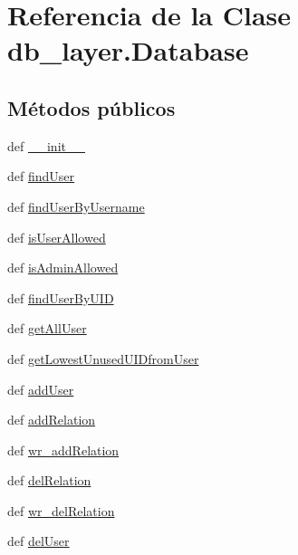 \hypertarget{classdb__layer_1_1_database}{\section{Referencia de la Clase db\-\_\-layer.\-Database}
\label{classdb__layer_1_1_database}
}
\subsection*{Métodos públicos}
\begin{DoxyCompactItemize}
\item 
def \hyperlink{classdb__layer_1_1_database_a2e4b8be9ebcb91f37e9377164e060c2a}{\-\_\-\-\_\-init\-\_\-\-\_\-}
\item 
def \hyperlink{classdb__layer_1_1_database_aaa54107650dc6511c7afdaf98112d4c1}{find\-User}
\item 
def \hyperlink{classdb__layer_1_1_database_a321ec63103a76c21fb556f82bc03e08f}{find\-User\-By\-Username}
\item 
def \hyperlink{classdb__layer_1_1_database_a738e07ff3b7292931bb057d174866249}{is\-User\-Allowed}
\item 
def \hyperlink{classdb__layer_1_1_database_a1f4a9b4e8dbd15d9f0ce74c1464ec3f9}{is\-Admin\-Allowed}
\item 
def \hyperlink{classdb__layer_1_1_database_aa97a7c93c41d97e60600dec9fb87270e}{find\-User\-By\-U\-I\-D}
\item 
def \hyperlink{classdb__layer_1_1_database_aa56ec835e0baf06452952528e12062bc}{get\-All\-User}
\item 
def \hyperlink{classdb__layer_1_1_database_a99ba044bb2e8692e27c34b74f6420ce8}{get\-Lowest\-Unused\-U\-I\-Dfrom\-User}
\item 
def \hyperlink{classdb__layer_1_1_database_a607d0253401fe69017f3e2b397a66c65}{add\-User}
\item 
def \hyperlink{classdb__layer_1_1_database_a1d5f62d1f3ee91d692483abe8c774c89}{add\-Relation}
\item 
def \hyperlink{classdb__layer_1_1_database_aa682552b52caba32fde23ef44fb63ade}{wr\-\_\-add\-Relation}
\item 
def \hyperlink{classdb__layer_1_1_database_ab4e221a9ae93a5780c084d49d01029d8}{del\-Relation}
\item 
def \hyperlink{classdb__layer_1_1_database_ab20da0ac6137c6a276f27f59a90d87e3}{wr\-\_\-del\-Relation}
\item 
def \hyperlink{classdb__layer_1_1_database_ad8447f580fdb6dc37c23fe4220ee62b9}{del\-User}

\end{DoxyCompactItemize}
